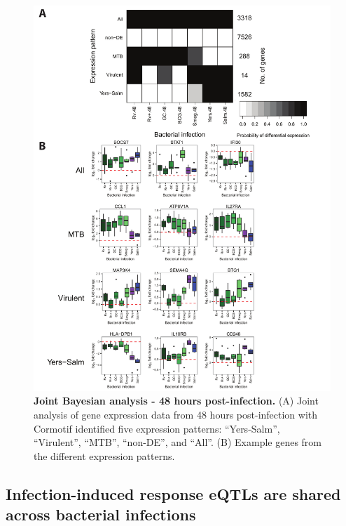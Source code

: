 \begin{figure}
\centering \includegraphics[width=5in]{img/ch02/fig-04-joint-48h.pdf}
\caption[Joint Bayesian analysis - 48 hours
  post-infection.]{\textbf{Joint Bayesian analysis - 48 hours
    post-infection.} (A) Joint analysis of gene expression data from
  48 hours post-infection with Cormotif identified five expression
  patterns: ``Yers-Salm'', ``Virulent'', ``MTB'', ``non-DE'', and
  ``All''. (B) Example genes from the different expression patterns.}
\label{fig:joint-48h}
\end{figure}

\subsection{Infection-induced response eQTLs are shared across
bacterial
infections}\label{infection-induced-response-eqtls-are-shared-across-bacterial-infections}

